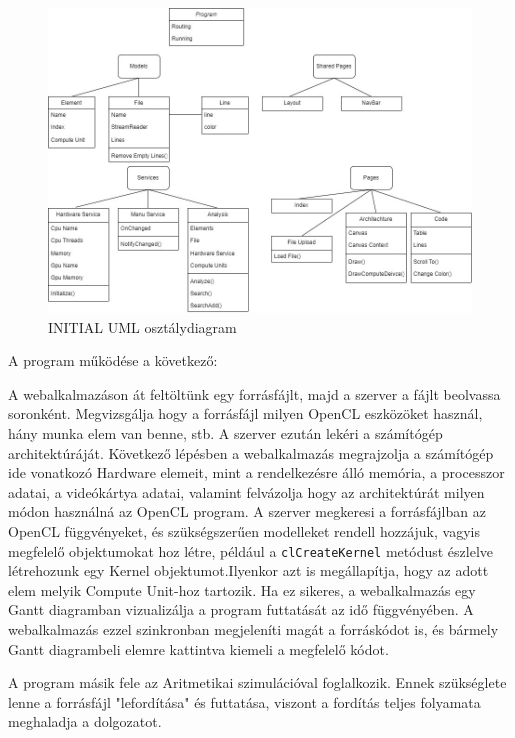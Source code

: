 \begin{figure}[h]
\centering
\includegraphics[scale=0.4]{images/UML.jpg}
\caption{INITIAL UML osztálydiagram}
\label{fig:uml}
\end{figure}

A program működése a következő:

A webalkalmazáson át feltöltünk egy forrásfájlt, majd a szerver a fájlt beolvassa soronként. Megvizsgálja hogy a forrásfájl milyen OpenCL eszközöket használ, hány munka elem van benne, stb. A szerver ezután lekéri a számítógép architektúráját. Következő lépésben a webalkalmazás megrajzolja a számítógép ide vonatkozó Hardware elemeit, mint a rendelkezésre álló memória, a processzor adatai, a videókártya adatai, valamint felvázolja hogy az architektúrát milyen módon használná az OpenCL program. A szerver megkeresi a forrásfájlban az OpenCL függvényeket, és szükségszerűen modelleket rendell hozzájuk, vagyis megfelelő objektumokat hoz létre, például a \texttt{clCreateKernel} metódust észlelve létrehozunk egy Kernel objektumot.Ilyenkor azt is megállapítja, hogy az adott elem melyik Compute Unit-hoz tartozik. Ha ez sikeres, a webalkalmazás egy Gantt diagramban vizualizálja a program futtatását az idő függvényében. A webalkalmazás ezzel szinkronban megjeleníti magát a forráskódot is, és bármely Gantt diagrambeli elemre kattintva kiemeli a megfelelő kódot.

A program másik fele az Aritmetikai szimulációval foglalkozik. Ennek szükséglete lenne a forrásfájl "lefordítása" és futtatása, viszont a fordítás teljes folyamata meghaladja a dolgozatot.

